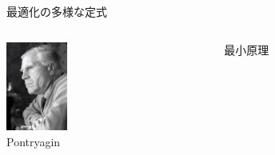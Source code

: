 \documentclass[twocolumn, dvipdfmx,12pt]{beamer}
\begin{document}
\begin{frame}{最適化の多様な定式}
\begin{columns}
            \begin{column}{0.5\textwidth}
                \begin{boxnote}
                    \begin{columns}
                        \begin{column}{.5\textwidth}
                            \includegraphics[clip, width = 2.0cm]{Pontryagin.png}\\
                            {\tiny Pontryagin}
                            \centering
                        \end{column}
                        \begin{column}{.5\textwidth}
                            最小原理 \\
                        \end{column}
                    \end{columns}
                \end{boxnote}
            \end{column}
        \end{columns}

    \end{frame}
\end{document}
